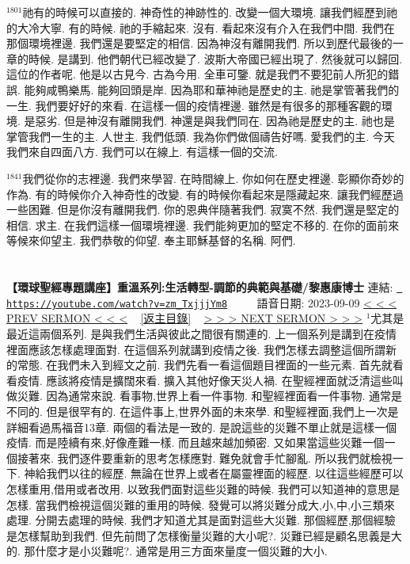 \documentclass{book}
\begin{document}
$^{1801}$祂有的時候可以直接的.
神奇性的神跡性的.
改變一個大環境.
讓我們經歷到祂的大冷大寧.
有的時候.
祂的手縮起來.
沒有.
看起來沒有介入在我們中間.
我們在那個環境裡邊.
我們還是要堅定的相信.
因為神沒有離開我們.
所以到歷代最後的一章的時候.
是講到.
他們朝代已經改變了.
波斯大帝國已經出現了.
然後就可以歸回.
這位的作者呢.
他是以古見今.
古為今用.
全車可鑒.
就是我們不要犯前人所犯的錯誤.
能夠咸鴨樂馬.
能夠回頭是岸.
因為耶和華神祂是歷史的主.
祂是掌管著我們的一生.
我們要好好的來看.
在這樣一個的疫情裡邊.
雖然是有很多的那種客觀的環境.
是惡劣.
但是神沒有離開我們.
神還是與我們同在.
因為祂是歷史的主.
祂也是掌管我們一生的主.
人世主.
我們低頭.
我為你們做個禱告好嗎.
愛我們的主.
今天我們來自四面八方.
我們可以在線上.
有這樣一個的交流.

$^{1841}$我們從你的志裡邊.
我們來學習.
在時間線上.
你如何在歷史裡邊.
彰顯你奇妙的作為.
有的時候你介入神奇性的改變.
有的時候你看起來是隱藏起來.
讓我們經歷過一些困難.
但是你沒有離開我們.
你的恩典伴隨著我們.
寂寞不然.
我們還是堅定的相信.
求主.
在我們這樣一個環境裡邊.
我們能夠更加的堅定不移的.
在你的面前來等候來仰望主.
我們恭敬的仰望.
奉主耶穌基督的名稱.
阿們.
\newpage



\section{}
\label{sec:zm_TxjjjYm8}
\textbf{【環球聖經專題講座】重溫系列:生活轉型-調節的典範與基礎/黎惠康博士}
\newline
\newline
連結: \href{https://youtube.com/watch?v=zm_TxjjjYm8}{\texttt{ https://youtube.com/watch?v=zm\_TxjjjYm8}} ~~~~ 語音日期: 2023-09-09 
\newline
\newline
\hyperref[sec:PkwOeUk00co]{\small{< < < PREV SERMON < < <}}
~
\hyperref[sec:index]{\small{[返主目錄]}}
~
\hyperref[sec:I0SwLQsiJOs]{\small{> > > NEXT SERMON > > >}}
\newline
\newline
$^{1}$尤其是最近這兩個系列.
是與我們生活與彼此之間很有關連的.
上一個系列是講到在疫情裡面應該怎樣處理面對.
在這個系列就講到疫情之後.
我們怎樣去調整這個所謂新的常態.
在我們未入到經文之前.
我們先看一看這個題目裡面的一些元素.
首先就看看疫情.
應該將疫情是擴闊來看.
擴入其他好像天災人禍.
在聖經裡面就泛清這些叫做災難.
因為通常來說.
看事物,世界上看一件事物.
和聖經裡面看一件事物.
通常是不同的.
但是很罕有的.
在這件事上,世界外面的未來學.
和聖經裡面,我們上一次是詳細看過馬福音13章.
兩個的看法是一致的.
是說這些的災難不單止就是這樣一個疫情.
而是陸續有來,好像產難一樣.
而且越來越加頻密.
又如果當這些災難一個一個接著來.
我們逐件要重新的思考怎樣應對.
難免就會手忙腳亂.
所以我們就檢視一下.
神給我們以往的經歷.
無論在世界上或者在屬靈裡面的經歷.
以往這些經歷可以怎樣重用,借用或者改用.
以致我們面對這些災難的時候.
我們可以知道神的意思是怎樣.
當我們檢視這個災難的重用的時候.
發覺可以將災難分成大,小,中,小三類來處理.
分開去處理的時候.
我們才知道尤其是面對這些大災難.
那個經歷,那個經驗是怎樣幫助到我們.
但先前問了怎樣衡量災難的大小呢?.
災難已經是顧名思義是大的.
那什麼才是小災難呢?.
通常是用三方面來量度一個災難的大小.
\end{document}
